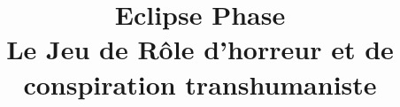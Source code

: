 \documentclass{book}
\begin{document}
\title{Eclipse Phase\\
  Le Jeu de Rôle d'horreur et de conspiration transhumaniste}
\date{}

\maketitle
  
\begin{mainmatter}



\end{mainmatter}
\end{document}
